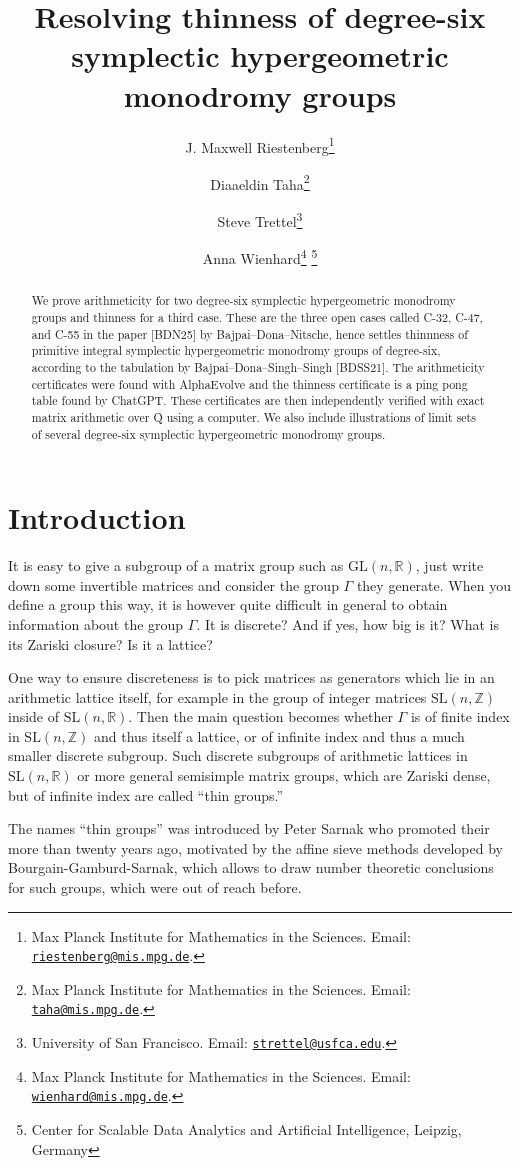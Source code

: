 \documentclass[11pt]{article}
\title{Resolving thinness of degree-six symplectic hypergeometric monodromy groups}
\author{
  J. Maxwell Riestenberg\thanks{Max Planck Institute for Mathematics in the Sciences. Email:
		\href{mailto:riestenberg@mis.mpg.de} {\nolinkurl {riestenberg@mis.mpg.de}}.}
\and
  Diaaeldin Taha\thanks{Max Planck Institute for Mathematics in the Sciences. Email:
		\href{mailto:taha@mis.mpg.de} {\nolinkurl {taha@mis.mpg.de}}.} 
\and
  Steve Trettel\thanks{University of San Francisco. Email:
		\href{mailto:strettel@usfca.edu} {\nolinkurl {strettel@usfca.edu}}.} 
\and
  Anna Wienhard\thanks{Max Planck Institute for Mathematics in the Sciences. Email:
		\href{mailto:wienhard@mis.mpg.de} {\nolinkurl {wienhard@mis.mpg.de}}.} 
        \thanks{Center for Scalable Data Analytics and Artificial Intelligence, Leipzig, Germany}
}
\date{}
\begin{document}
\maketitle

\begin{abstract}
We prove arithmeticity for two degree-six symplectic hypergeometric monodromy groups and thinness for a third case.
These are the three open cases called C-32, C-47, and C-55 in the paper [BDN25] by Bajpai--Dona--Nitsche, hence settles thinnness of primitive integral symplectic hypergeometric monodromy groups of degree-six, according to the tabulation by Bajpai--Dona--Singh--Singh [BDSS21]. 
The arithmeticity certificates were found with AlphaEvolve and the thinness certificate is a ping pong table found by ChatGPT.
These certificates are then independently verified with exact matrix arithmetic over Q using a computer. 
We also include illustrations of limit sets of several degree-six symplectic hypergeometric monodromy groups.
\end{abstract}

\section{Introduction}

It is easy to give a subgroup of a matrix group such as $\mathrm{GL}(n,\mathbb{R})$, just write down some invertible matrices and consider the group $\Gamma$ they generate.
When you define a group this way, it is however quite difficult in general to obtain information about the group $\Gamma$. 
It is discrete? And if yes, how big is it? What is its Zariski closure? Is it a lattice? 

One way to ensure discreteness is to pick matrices as generators which lie in an arithmetic lattice itself, for example in the group of integer matrices $\mathrm{SL}(n,\mathbb{Z})$ inside of $\mathrm{SL}(n,\mathbb{R})$. 
Then the main question becomes whether $\Gamma$ is of finite index in $\mathrm{SL}(n,\mathbb{Z})$ and thus itself a lattice, or of infinite index and thus a much smaller discrete subgroup. 
Such discrete subgroups of arithmetic lattices in $\mathrm{SL}(n,\mathbb{R})$ or more general semisimple matrix groups, which are Zariski dense, but of infinite index are called ``thin groups.'' 

The names ``thin groups'' was introduced by Peter Sarnak who promoted their more than twenty years ago, motivated by the affine sieve methods developed by Bourgain-Gamburd-Sarnak, which allows to draw number theoretic conclusions for such groups, which were out of reach before. 
\end{document}
